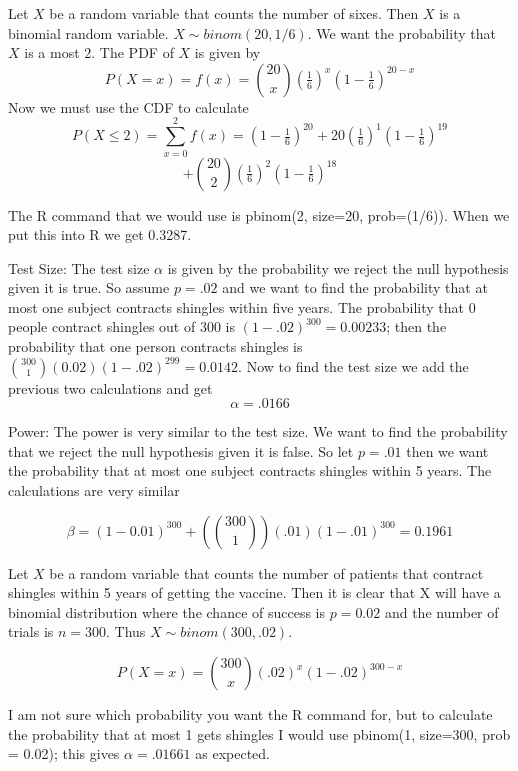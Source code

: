 \documentclass[11pt,largemargins]{homework}
\begin{document}
\maketitle

\question
Let $X$ be a random variable that counts the number of sixes. Then $X$ is a binomial random variable. 
$X \sim binom(20, 1/6)$. We want the probability that $X$ is a most $2$. The PDF of $X$ is given by 
\[P(X = x) = f(x) = {20 \choose x}(\tfrac{1}{6})^x(1 - \tfrac{1}{6})^{20 - x}\]
Now we must use the CDF to calculate 
\[P(X \leq 2) = \sum_{x =0}^2 f(x) = (1 - \tfrac{1}{6})^{20} + 20(\tfrac{1}{6})^1(1 - \tfrac{1}{6})^{19}\]
\[ + {20 \choose 2}(\tfrac{1}{6})^2(1 - \tfrac{1}{6})^{18}\]

The R command that we would use is pbinom(2, size=20, prob=(1/6)). When we put this into 
R we get  0.3287. 

\newpage
\question

Test Size: 
The test size $\alpha$ is given by the probability we reject the null hypothesis given it is true. So assume $p = .02$ and we 
want to find the probability that at most one subject contracts shingles within five years. The probability that 0 people contract shingles 
out of 300 is $(1 - .02)^{300} = 0.00233$; then the probability that one person contracts shingles is ${300 \choose 1}(0.02)(1 - .02)^{299} = 0.0142$. Now 
to find the test size we add the previous two calculations and get 
\[\alpha = .0166\]

Power: 
The power is very similar to the test size. We want to find the probability that we reject the null hypothesis given it is false. 
So let $p = .01$ then we want the probability that at most one subject contracts shingles within 5 years. The calculations are very 
similar 

\[ \beta = (1 - 0.01)^{300} + (300 \choose 1)(.01)(1 - .01)^{300} = 0.1961 \]


Let $X$ be a random variable that counts the number of patients that contract shingles within 5 years of getting the vaccine. 
Then it is clear that X will have a binomial distribution where the chance of success is $p = 0.02$ and the number of trials is 
$n = 300$. Thus $X \sim binom(300, .02)$. 

\[P(X = x) = {300 \choose x}(.02)^x(1 - .02)^{300 - x} \] 

I am not sure which probability you want the R command for, but to calculate the probability that at most 1 gets shingles 
I would use pbinom(1, size=300, prob = 0.02); this gives $\alpha = .01661$ as expected. 
\end{document}
